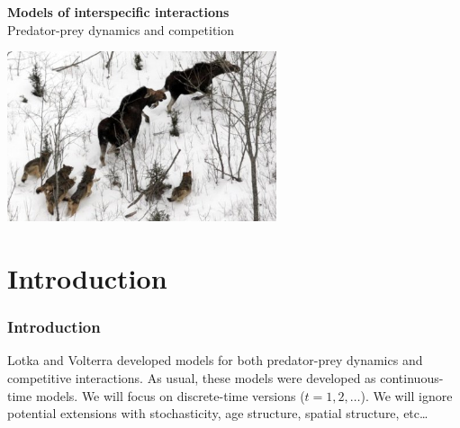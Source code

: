 \documentclass[color=usenames,dvipsnames]{beamer}\usepackage[]{graphicx}\usepackage[]{color}
\begin{document}
\begin{frame}[plain]
  \begin{center}
    {\LARGE {\color{Black} \bf Models of interspecific interactions} \\
      \LARGE {\color{Black} Predator-prey dynamics and
        competition} \par}
    \vspace{0.5cm}
    \vfill
      \includegraphics[height=5cm,keepaspectratio]{figs/isle-royale1} \\
  \end{center}
\end{frame}




\section{Introduction}




\begin{frame}
  \frametitle{Introduction}
  \large
  Lotka and Volterra developed models for both predator-prey
      dynamics and competitive interactions.
      \pause \vfill
  As usual, these models were developed as
      continuous-time models.
      \pause \vfill
  We will focus on discrete-time versions ($t = 1, 2, \ldots$).
      \pause \vfill
  We will ignore potential extensions with stochasticity, age
      structure, spatial structure, etc\dots
\end{frame}
\end{document}
